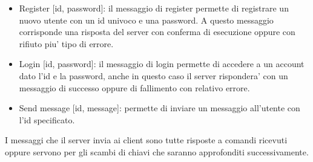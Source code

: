 \begin{itemize}
    \item Register [id, password]: il messaggio di register permette di registrare un nuovo utente
    con un id univoco e una password. A questo messaggio corrisponde una risposta del server con
    conferma di esecuzione oppure con rifiuto piu' tipo di errore.
    \item Login [id, password]: il messaggio di login permette di accedere a un account dato l'id e
    la password, anche in questo caso il server rispondera' con un messaggio di successo oppure di
    fallimento con relativo errore.
    \item Send message [id, message]: permette di inviare un messaggio all'utente con l'id
    specificato.
\end{itemize}
I messaggi che il server invia ai client sono tutte risposte a comandi ricevuti oppure servono per
gli scambi di chiavi che saranno approfonditi successivamente.